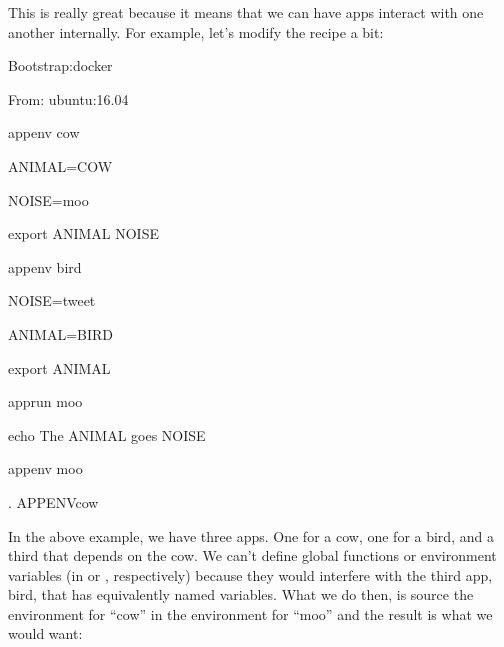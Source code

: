 \documentclass[letterpaper,10pt,english]{sphinxmanual}
\begin{document}
\begin{sphinxVerbatim}[commandchars=\\\{\}]



\end{sphinxVerbatim}

This is really great because it means that we can have apps interact
with one another internally. For example, let’s modify the recipe a bit:

%
\begin{sphinxVerbatim}[commandchars=\\\{\}]
Bootstrap:docker

From: ubuntu:16.04


\PYGZpc{}appenv cow

    ANIMAL=COW

    NOISE=moo

    export ANIMAL NOISE


\PYGZpc{}appenv bird

    NOISE=tweet

    ANIMAL=BIRD

    export ANIMAL


\PYGZpc{}apprun moo

    echo The \PYGZdl{}\PYGZob{}ANIMAL\PYGZcb{} goes \PYGZdl{}\PYGZob{}NOISE\PYGZcb{}


\PYGZpc{}appenv moo

    . \PYGZdl{}\PYGZob{}APPENV\PYGZus{}cow\PYGZcb{}
\end{sphinxVerbatim}

In the above example, we have three apps. One for a cow, one for a bird,
and a third that depends on the cow. We can’t define global functions or
environment variables (in  or   , respectively) because they would
interfere with the third app, bird, that has equivalently named
variables. What we do then, is source the environment for “cow” in the
environment for “moo” and the result is what we would want:
\end{document}
